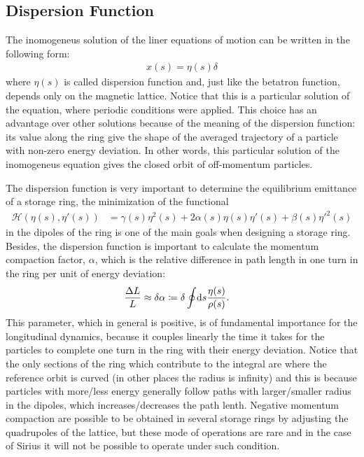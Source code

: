 \documentclass[
	12pt,				%
	openright,			%
	oneside,			%
	a4paper,		%
	chapter=TITLE,		%
	section=TITLE,		%
    brazil,				%
	english,			%
	sumario=tradicional,
	]{abntex2}
\begin{document}
    \subsection{Dispersion Function}

	The inomogeneus solution of the liner equations of motion can be written in the following form:
	\begin{align}
		x(s) = \eta(s)\delta
	\end{align}
	where $\eta(s)$ is called dispersion function and, just like the betatron function, depends only on the magnetic lattice. Notice that this is a particular solution of the equation, where periodic conditions were applied. This choice has an advantage over other solutions because of the meaning of the dispersion function: its value along the ring give the shape of the averaged trajectory of a particle with non-zero energy deviation. In other words, this particular solution of the inomogeneus equation gives the closed orbit of off-momentum particles.

	The dispersion function is very important to determine the equilibrium emittance of a storage ring, the minimization of the functional
	\begin{align}
		\mathscr{H}(\eta(s), \eta'(s)) &= \gamma(s)\eta^2(s) +
										2\alpha(s)\eta(s)\eta'(s) +
										 \beta(s)\eta'^2(s)
	\end{align}
	in the dipoles of the ring is one of the main goals when designing a storage ring. Besides, the dispersion function is important to calculate the momentum compaction factor, $\alpha$, which is the relative difference in path length in one turn in the ring per unit of energy deviation:
	\begin{align}\label{eq:momentum_compaction}
		\frac{\Delta L}{L} &\approx \delta \alpha \coloneqq \delta \oint\!\text{d}s \frac{\eta(s)}{\rho(s)}.
	\end{align}
	This parameter, which in general is positive, is of fundamental importance for the longitudinal dynamics, because it couples linearly the time it takes for the particles to complete one turn in the ring with their energy deviation. Notice that the only sections of the ring which contribute to the integral are where the reference orbit is curved (in other places the radius is infinity) and this is because particles with more/less energy generally follow paths with larger/smaller radius in the dipoles, which increases/decreases the path lenth. Negative momentum compaction are possible to be obtained in several storage rings by adjusting the quadrupoles of the lattice, but these mode of operations are rare and in the case of Sirius it will not be possible to operate under such condition.
\end{document}
